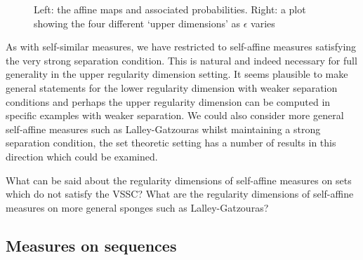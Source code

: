 \begin{figure}[H]
\begin{minipage}{.5\textwidth}
		
	\end{minipage}
	
	\caption{Left: the affine maps and associated probabilities.  Right: a plot showing the four different `upper dimensions' as $\epsilon$ varies}
	\label{ch-upper-reg:fig:badcarpet}
\end{figure}

As with self-similar measures, we have restricted to self-affine measures satisfying the very strong separation condition. This is natural and indeed necessary for full generality in the upper regularity dimension setting. It seems plausible to make general statements for the lower regularity dimension with weaker separation conditions and perhaps the upper regularity dimension can be computed in specific examples with weaker separation. We could also consider more general self-affine measures such as Lalley-Gatzouras whilst maintaining a strong separation condition, the set theoretic setting has a number of results in this direction which could be examined.

\begin{question}
What can be said about the regularity dimensions of self-affine measures on sets which do not satisfy the VSSC? What are the regularity dimensions of self-affine measures on more general sponges such as Lalley-Gatzouras?
\end{question}


\subsection{Measures on sequences}\label{ch-upper-reg:sec:sequences}

